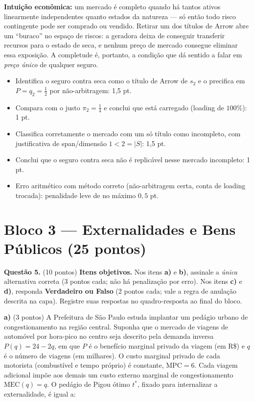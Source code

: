 \begin{solucao}
\textbf{Intuição econômica:} um mercado é completo quando há tantos ativos linearmente independentes quanto estados da natureza --- só então todo risco contingente pode ser comprado ou vendido. Retirar um dos títulos de Arrow abre um ``buraco'' no espaço de riscos: a geradora deixa de conseguir transferir recursos para o estado de seca, e nenhum preço de mercado consegue eliminar essa exposição. A completude é, portanto, a condição que dá sentido a falar em \emph{preço único} de qualquer seguro.
\rubricalabel
\begin{itemize}
\item Identifica o seguro contra seca como o título de Arrow de $s_2$ e o precifica em $P=q_2=\tfrac12$ por não-arbitragem: 1{,}5 pt.
\item Compara com o justo $\pi_2=\tfrac14$ e conclui que está carregado (loading de $100\%$): 1 pt.
\item Classifica corretamente o mercado com um só título como incompleto, com justificativa de span/dimensão $1<2=|S|$: 1{,}5 pt.
\item Conclui que o seguro contra seca não é replicável nesse mercado incompleto: 1 pt.
\item Erro aritmético com método correto (não-arbitragem certa, conta de loading trocada): penalidade leve de no máximo $0{,}5$ pt.
\end{itemize}
\end{solucao}


\clearpage
\section*{Bloco 3 --- Externalidades e Bens Públicos \hfill \normalsize (25 pontos)}

\textbf{Questão 5.} (10 pontos) \textbf{Itens objetivos.} Nos itens \textbf{a)} e \textbf{b)}, assinale a \emph{única} alternativa correta (3 pontos cada; não há penalização por erro). Nos itens \textbf{c)} e \textbf{d)}, responda \textbf{Verdadeiro ou Falso} (2 pontos cada; vale a regra de anulação descrita na capa). Registre suas respostas no quadro-resposta ao final do bloco.

\textbf{a)} (3 pontos) A Prefeitura de S\~ao Paulo estuda implantar um ped\'agio urbano de congestionamento na regi\~ao central. Suponha que o mercado de viagens de autom\'ovel por hora-pico no centro seja descrito pela demanda inversa $P(q) = 24 - 2q$, em que $P$ \'e o benef\'icio marginal privado da viagem (em R\$) e $q$ \'e o n\'umero de viagens (em milhares). O custo marginal privado de cada motorista (combust\'ivel e tempo pr\'oprio) \'e constante, $\text{MPC} = 6$. Cada viagem adicional impõe aos demais um custo externo marginal de congestionamento $\text{MEC}(q) = q$. O ped\'agio de Pigou \'otimo $t^*$, fixado para internalizar a externalidade, \'e igual a:

